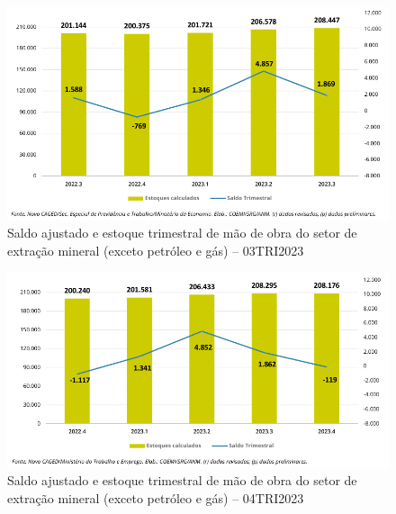 \begin{figure}[!htb]
    \centering
    \includegraphics[width=\textwidth]{figures/image4_saldo_estoque_3tri2023.png}
    \caption{Saldo ajustado e estoque trimestral de mão de obra do setor de extração mineral (exceto petróleo e gás) -- 03TRI2023}
    \label{fig:saldo_estoque_3tri2023}
\end{figure}

\begin{figure}[!htb]
    \centering
    \includegraphics[width=\textwidth]{figures/image5_saldo_estoque_4tri2023.png}
    \caption{Saldo ajustado e estoque trimestral de mão de obra do setor de extração mineral (exceto petróleo e gás) -- 04TRI2023}
    \label{fig:saldo_estoque_4tri2023}
\end{figure}

